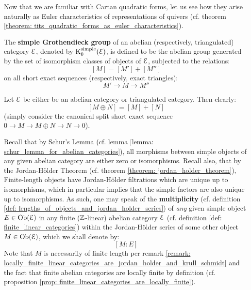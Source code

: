             Now that we are familiar with Cartan quadratic forms, let us see how they arise naturally as Euler characteristics of representations of quivers (cf. theorem \ref{theorem: tits_quadratic_forms_as_euler_characteristics}). 
            \begin{definition} \label{def: simple_grothendieck_groups}
                The \textbf{simple Grothendieck group} of an abelian (respectively, triangulated) category $\mathcal{E}$, denoted by $\mathrm{K}_0^{\mathrm{simple}}(\mathcal{E})$, is defined to be the abelian group generated by the set of isomorphism classes of objects of $\mathcal{E}$, subjected to the relations:
                    $$[M] = [M'] + [M'']$$
                on all short exact sequences (respectively, exact triangles):
                    $$M' \to M \to M''$$
            \end{definition}
            \begin{remark}
                Let $\mathcal{E}$ be either be an abelian category or triangulated category. Then clearly:
                    $$[M \oplus N] = [M] + [N]$$
                (simply consider the canonical split short exact sequence $0 \to M \to M \oplus N \to N \to 0$).
            \end{remark}
            \begin{convention}
                Recall that by Schur's Lemma (cf. lemma \ref{lemma: schur_lemma_for_abelian_categories}), all morphisms between simple objects of any given abelian category are either zero or isomorphisms. Recall also, that by the Jordan-H\"older Theorem (cf. theorem \ref{theorem: jordan_holder_theorem}), Finite-length objects have Jordan-H\"older filtrations which are unique up to isomorphisms, which in particular implies that the simple factors are also unique up to isomorphisms. As such, one may speak of the \textbf{multiplicity} (cf. definition \ref{def: lengths_of_objects_and_jordan_holder_series}) of \textit{any} given simple object $E \in \mathrm{Ob}(\mathcal{E})$ in any finite ($\mathbb{Z}$-linear) abelian category $\mathcal{E}$ (cf. definition \ref{def: finite_linear_categories}) within the Jordan-H\"older series of some other object $M \in \mathrm{Ob}(\mathcal{E})$, which we shall denote by:
                    $$[M : E]$$
                Note that $M$ is necessarily of finite length per remark \ref{remark: locally_finite_linear_categories_are_jordan_holder_and_krull_schmidt} and the fact that finite abelian categories are locally finite by definition (cf. proposition \ref{prop: finite_linear_categories_are_locally_finite}).
            \end{convention}
